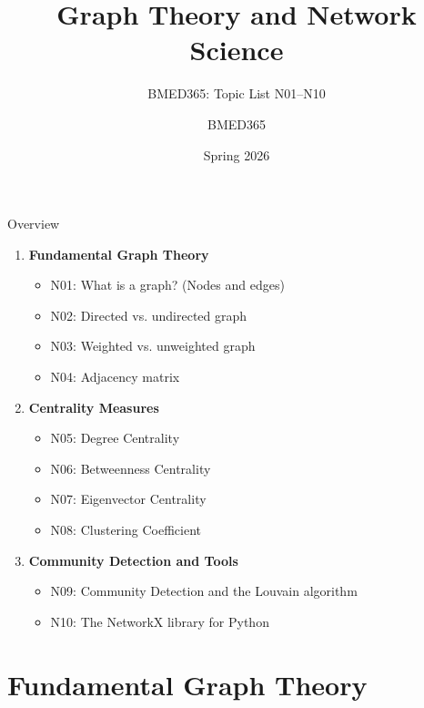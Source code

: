 \documentclass[aspectratio=169, 10pt]{beamer}
\title{Graph Theory and Network Science}
\subtitle{BMED365: Topic List N01--N10}
\author{BMED365}
\date{Spring 2026}
\begin{document}
\begin{frame}
    \titlepage
\end{frame}

\begin{frame}{Overview}
    \begin{enumerate}
        \item \textbf{Fundamental Graph Theory}
        \begin{itemize}
            \item N01: What is a graph? (Nodes and edges)
            \item N02: Directed vs. undirected graph
            \item N03: Weighted vs. unweighted graph
            \item N04: Adjacency matrix
        \end{itemize}
        \item \textbf{Centrality Measures}
        \begin{itemize}
            \item N05: Degree Centrality
            \item N06: Betweenness Centrality
            \item N07: Eigenvector Centrality
            \item N08: Clustering Coefficient
        \end{itemize}
        \item \textbf{Community Detection and Tools}
        \begin{itemize}
            \item N09: Community Detection and the Louvain algorithm
            \item N10: The NetworkX library for Python
        \end{itemize}
    \end{enumerate}
\end{frame}

\section{Fundamental Graph Theory}
\end{document}
